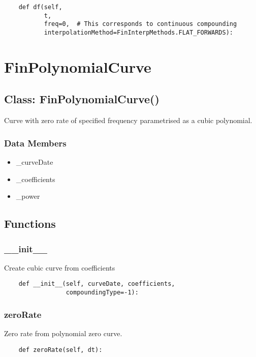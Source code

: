 \documentclass[twoside,11pt]{book}
\begin{document}
\begin{lstlisting}
    def df(self,
           t,
           freq=0,  # This corresponds to continuous compounding
           interpolationMethod=FinInterpMethods.FLAT_FORWARDS):
\end{lstlisting}

\newpage
\section{FinPolynomialCurve}

\subsection*{Class: FinPolynomialCurve()}
Curve with zero rate of specified frequency parametrised  as a cubic polynomial.  

\subsubsection*{Data Members}
\begin{itemize}
\item{\_curveDate}
\item{\_coefficients}
\item{\_power}
\end{itemize}

\subsection*{Functions}

\subsubsection*{{\bf \_\_init\_\_}}
Create cubic curve from coefficients  

\begin{lstlisting}
    def __init__(self, curveDate, coefficients,
                 compoundingType=-1):
\end{lstlisting}

\subsubsection*{{\bf zeroRate}}
Zero rate from polynomial zero curve.  

\begin{lstlisting}
    def zeroRate(self, dt):
\end{lstlisting}
\end{document}
